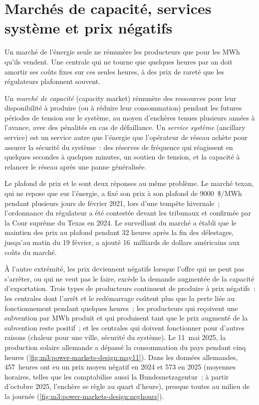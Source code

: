 \section{Marchés de capacité, services système et prix négatifs}

Un marché de l'énergie seule ne rémunère les producteurs que pour les MWh qu'ils vendent. Une centrale qui ne tourne que quelques
heures par an doit amortir ses coûts fixes sur ces seules heures, à des prix de rareté que les régulateurs
plafonnent souvent.

\begin{definition}\label{def:m3:power-markets-design:capacity}
Un \emph{marché de capacité} (capacity market) rémunère des ressources pour leur disponibilité à
produire (ou à réduire leur consommation) pendant les futures périodes de tension sur le système, au moyen d'enchères
tenues plusieurs années à l'avance, avec des pénalités en cas de défaillance. Un \emph{service
système} (ancillary service) est un service autre que l'énergie que l'opérateur de réseau
achète pour assurer la sécurité du système~: des réserves de fréquence qui réagissent en quelques secondes à quelques minutes,
un soutien de tension, et la capacité à relancer le réseau après une panne généralisée.
\end{definition}

Le plafond de prix et le  sont deux réponses au même problème. Le marché texan,
qui ne repose que sur l'énergie, a fixé son prix à son plafond de \qty{9000}{\$/MWh} pendant plusieurs jours de février
2021, lors d'une tempête hivernale~; l'ordonnance du régulateur a été contestée devant les tribunaux et confirmée par la
Cour suprême du Texas en 2024. Le surveillant du marché a établi que le maintien des prix au plafond pendant 32
heures après la fin des délestages, jusqu'au matin du 19 février, a ajouté 16~milliards de dollars américains
aux coûts du marché.

À l'autre extrémité, les prix deviennent négatifs lorsque l'offre qui ne peut pas s'arrêter, ou qui ne veut pas le faire, excède
la demande augmentée de la capacité d'exportation. Trois types de producteurs continuent de produire à prix négatifs~:
les centrales dont l'arrêt et le redémarrage coûtent plus que la perte liée au fonctionnement pendant quelques heures~;
les producteurs qui reçoivent une subvention par MWh produit et qui produisent tant que le prix augmenté de la
subvention reste positif~; et les centrales qui doivent fonctionner pour d'autres raisons (chaleur pour une ville,
sécurité du système). Le 11~mai 2025, la production solaire allemande a dépassé la consommation du pays pendant cinq
heures (\cref{fig:m3:power-markets-design:may11}). Dans les données allemandes, 457~heures ont eu un prix moyen négatif
en 2024 et 573 en 2025 (moyennes horaires, telles que les comptabilise aussi
la Bundesnetzagentur~; à partir d'octobre 2025, l'enchère se règle au quart d'heure), presque toutes au
milieu de la journée (\cref{fig:m3:power-markets-design:neghours}).


